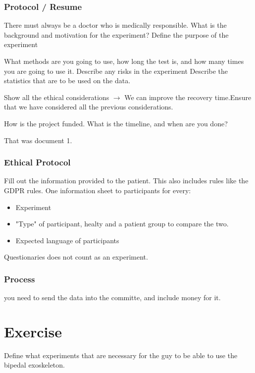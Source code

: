 \documentclass[a4paper]{article}
\begin{document}
\subsubsection{Protocol / Resume}
There must always be a doctor who is medically responsible. 
What is the background and motivation for the experiment?
Define the purpose of the experiment

What methods are you going to use, how long the test is, and how many times you are going to use it. 
Describe any risks in the experiment
Describe the statistics that are to be used on the data. 

Show all the ethical considerations $ \rightarrow $ We can improve the recovery time.Ensure that we have considered all the previous considerations. 

How is the project funded. 
What is the timeline, and when are you done?

That was document 1.

\subsubsection{Ethical Protocol}
Fill out the information provided to the patient. This also includes rules like the GDPR rules. 
One information sheet to participants for every:
\begin{itemize}
	\item Experiment
	\item "Type" of participant, healty and a patient group to compare the two. 
	\item Expected language of participants
\end{itemize}

Questionaries does not count as an experiment.

\subsubsection{Process}
you need to send the data into the committe, and include money for it.




\section{Exercise}
Define what experiments that are necessary for the guy to be able to use the bipedal exoskeleton.
\end{document}
